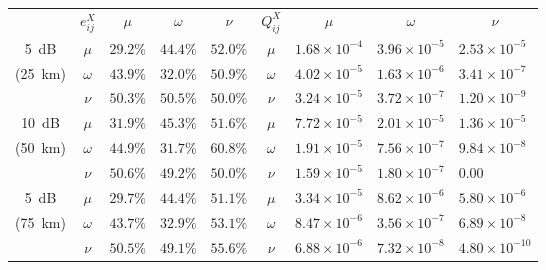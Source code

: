 \begin{table}[htbp]
\centering
\begin{tabular}{cclllclll}
        & $e^X_{ij}$ & \multicolumn{1}{c}{$\mu$} & \multicolumn{1}{c}{$\omega$} & \multicolumn{1}{c}{$\nu$} & $Q^X_{ij}$ & \multicolumn{1}{c}{$\mu$} & \multicolumn{1}{c}{$\omega$} & \multicolumn{1}{c}{$\nu$} \vspace{5pt}\\
\SI{5}{dB}  & $\mu$        & $29.2\%$                  & $44.4\%$                  & $52.0\%$                  & $\mu$        & $1.68\times10^{-4}$     & $3.96\times10^{-5}$     & $2.53\times10^{-5}$     \\
(\SI{25}{\km}) & $\omega$        & $43.9\%$                  & $32.0\%$                  & $50.9\%$                  & $\omega$        & $4.02\times10^{-5}$     & $1.63\times10^{-6}$     & $3.41\times10^{-7}$     \\
        & $\nu$        & $50.3\%$                  & $50.5\%$                  & $50.0\%$                  & $\nu$        & $3.24\times10^{-5}$     & $3.72\times10^{-7}$     & $1.20\times10^{-9}$     \vspace{5pt}\\
        \SI{10}{dB}  & $\mu$        & $31.9\%$                  & $45.3\%$                  & $51.6\%$                  & $\mu$        & $7.72\times10^{-5}$     & $2.01\times10^{-5}$     & $1.36\times10^{-5}$     \\
(\SI{50}{\km}) & $\omega$        & $44.9\%$                  & $31.7\%$                  & $60.8\%$                  & $\omega$        & $1.91\times10^{-5}$     & $7.56\times10^{-7}$     & $9.84\times10^{-8}$\\
        & $\nu$        & $50.6\%$                  & $49.2\%$                  & $50.0\%$	 & $\nu$        & $1.59\times10^{-5}$     & $1.80\times10^{-7}$     & $0.00$     \vspace{5pt}\\
        \SI{5}{dB}  & $\mu$        & $29.7\%$                  & $44.4\%$                  & $51.1\%$                  & $\mu$        & $3.34\times10^{-5}$     & $8.62\times10^{-6}$     & $5.80\times10^{-6}$     \\
(\SI{75}{\km}) & $\omega$        & $43.7\%$                  & $32.9\%$                  & $53.1\%$                  & $\omega$        & $8.47\times10^{-6}$     & $3.56\times10^{-7}$     & $6.89\times10^{-8}$\\
        & $\nu$        & $50.5\%$                  & $49.1\%$                  & $55.6\%$                  & $\nu$        & $6.88\times10^{-6}$     & $7.32\times10^{-8}$     & $4.80\times10^{-10}$     \vspace{5pt}\\

\end{tabular}
\end{table}
